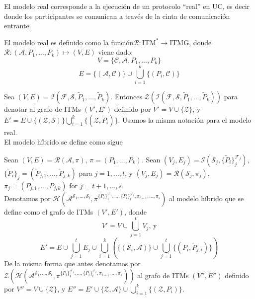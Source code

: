 El modelo real corresponde a la ejecución de un protocolo ``real'' en UC, es decir
donde los participantes se comunican a través de la cinta de comunicación entrante.

\begin{definicion}
El modelo real es definido como la función$\mathcal{R}:\textrm{ITM}^* \to \textrm{ITMG}$,
donde $\mathcal{R}:(\mathcal{A}, P_1, \ldots, P_k) \mapsto (V, E)$ viene dado:
$$V = \{\mathcal{C}, \mathcal{A}, P_1, \ldots, P_k\}$$
$$E = \{(\mathcal{A}, \mathcal{C})\}\cup\bigcup_{i=1}^k\{(P_i, \mathcal{C})\}$$
\end{definicion}

Sea $(V, E) = \mathcal{I}(\mathcal{F}, \mathcal{S}, \tilde{P}_1, \ldots, \tilde{P}_k)$.
Entonces $\mathcal{Z}(\mathcal{I}(\mathcal{F}, \mathcal{S}, \tilde{P}_1, \ldots,
\tilde{P}_k))$ para denotar al grafo de ITMs $(V', E')$ definido por $V' = V \cup \{\mathcal{Z}\}$,
y $E' = E \cup \{(\mathcal{Z}, \mathcal{S})\} \bigcup_{i=1}^k \{(\mathcal{Z}, \tilde{P}_i)\}$.
Usamos la misma notación para el modelo real.\\

El modelo híbrido se define como sigue

\begin{definicion}
Sean
$(V, E) = \mathcal{R}(\mathcal{A}, \pi)$, $\pi = (P_1, \ldots, P_k)$.
Sean $(V_j, E_j) =
\mathcal{I}(\mathcal{S}_j,
            \{\tilde{P}_i \}_j^{\mathcal{F}_j})$,
$\{\tilde{P}_i\}_j = (\tilde{P}_{j, 1}, \ldots, \tilde{P}_{j, k})$ para $j = 1, \ldots, t$,
y $(V_j, E_j) = \mathcal{R}(\mathcal{S}_j,\pi_j)$,
$\pi_j = (P_{j, 1}, \ldots, P_{j, k})$ for $j = t+1, \ldots, s$.\\
Denotamos por
$\mathcal{H}(
    \mathcal{A}^{
        \mathcal{S}_1,
        \ldots,
        \mathcal{S}_t},
    \pi^{
        \{\tilde{P}_i\}_1^{\mathcal{F}_1},
        \ldots,
        \{\tilde{P}_i\}_t^{\mathcal{F}_t},
        \pi_{t+1},
        \ldots,
        \pi_s})$
al modelo híbrido que se define como el grafo de ITMs $(V', E')$, donde
$$V' = V \cup \bigcup_{j=1}^t V_j \textrm{, y}$$
$$E' = 
    E
    \cup
    \bigcup_{j=1}^t E_j
    \cup
    \bigcup_{i=1}^k
        \left(
            \{(\mathcal{S}_i, \mathcal{A})\}
            \cup
            \bigcup_{j=1}^t \{(P_i, \tilde{P}_{j, i})\}
        \right)$$
De la misma forma que antes denotamos por
$\mathcal{Z}(
    \mathcal{H}(
        \mathcal{A}^{
            \mathcal{S}_1,
            \ldots,
            \mathcal{S}_t},
        \pi^{
            \{\tilde{P}_i\}_1^{\mathcal{F}_1},
            \ldots,
            \{\tilde{P}_i\}_t^{\mathcal{F}_t},
            \pi_{t+1},
            \ldots,
            \pi_s}))$
al grafo de ITMs $(V'', E'')$ definido por
$V'' = V \cup \{\mathcal{Z}\}$,
y
$E'' = 
    E'
    \cup
    \{\mathcal{Z}, \mathcal{A}\}
    \cup 
    \bigcup_{i=1}^k \{(\mathcal{Z}, P_i)\}$.
\end{definicion}

